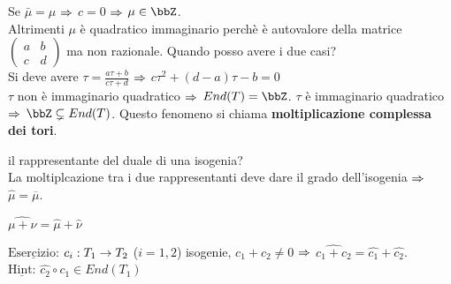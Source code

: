 Se $\bar{\mu}=\mu$ $\Rightarrow$ $c=0$ $\Rightarrow$ $\mu \in \bbZ$.\\
Altrimenti $\mu$ è quadratico immaginario perchè è autovalore della matrice
$\begin{pmatrix}
a & b \\
c & d
\end{pmatrix}$ ma non razionale.
Quando posso avere i due casi?\\
Si deve avere $\tau = \frac{a\tau + b}{c\tau + d}$ $\Rightarrow$ $c\tau^{2} + (d-a)\tau - b=0$\\
$\tau$ non è immaginario quadratico $\Rightarrow$ $End(T)=\bbZ$.
$\tau$ è immaginario quadratico $\Rightarrow$ $\bbZ \subsetneq End(T)$. Questo fenomeno si chiama {\bf moltiplicazione complessa dei tori}.

 il rappresentante del duale di una isogenia?\\
La moltiplcazione tra i due rappresentanti deve dare il grado dell'isogenia $\Rightarrow$ $\hat{\mu} = \overline{\mu}$. 
\begin{corollario}
$\hat{\mu + \nu} =\hat{\mu} + \hat{\nu}$
\end{corollario}

{\bf $\underline{\mbox{Esercizio:}}$} $c_{i}: T_{1} \rightarrow T_{2}$ ($i=1 , 2$) isogenie, $c_{1}+c_{2} \neq 0$ $\Rightarrow$ $\hat{c_{1} + c_{2}}=\hat{c_{1}}+\hat{c_{2}}$.\\
{\bf $\underline{\mbox{Hint:}}$} $\hat{c_{2}}\circ c_{1} \in End(T_{1})$

